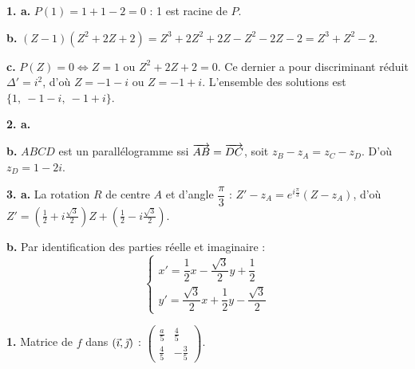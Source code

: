 \documentclass[11pt]{article}
\begin{document}

\textbf{1. a.} $P(1) = 1 + 1 - 2 = 0$ : 1 est racine de $P$.

\textbf{b.} $(Z - 1)(Z^2 + 2Z + 2) = Z^3 + 2Z^2 + 2Z - Z^2 - 2Z - 2 = Z^3 + Z^2 - 2$.

\textbf{c.} $P(Z) = 0 \Leftrightarrow Z = 1$ ou $Z^2 + 2Z + 2 = 0$. Ce dernier a pour discriminant réduit $\Delta' = i^2$, d'où $Z = -1 - i$ ou $Z = -1 + i$. L'ensemble des solutions est $\{1,\ -1 - i,\ -1 + i\}$.

\textbf{2. a.}
\begin{center}
\end{center}

\textbf{b.} $ABCD$ est un parallélogramme ssi $\overrightarrow{AB} = \overrightarrow{DC}$, soit $z_B - z_A = z_C - z_D$. D'où $z_D = 1 - 2i$.

\textbf{3. a.} La rotation $R$ de centre $A$ et d'angle $\dfrac{\pi}{3}$ : $Z' - z_A = e^{i\frac{\pi}{3}}(Z - z_A)$, d'où $Z' = \left(\tfrac{1}{2} + i\tfrac{\sqrt{3}}{2}\right)Z + \left(\tfrac{1}{2} - i\tfrac{\sqrt{3}}{2}\right)$.

\textbf{b.} Par identification des parties réelle et imaginaire :
\[ \begin{cases} x' = \dfrac{1}{2}x - \dfrac{\sqrt{3}}{2}y + \dfrac{1}{2} \\[1ex] y' = \dfrac{\sqrt{3}}{2}x + \dfrac{1}{2}y - \dfrac{\sqrt{3}}{2} \end{cases} \]

\textbf{1.} Matrice de $f$ dans $(\vec{\imath},\vec{\jmath})$ : $\begin{pmatrix} \frac{a}{5} & \frac{4}{5} \\[2pt] \frac{4}{5} & -\frac{3}{5} \end{pmatrix}$.
\end{document}
